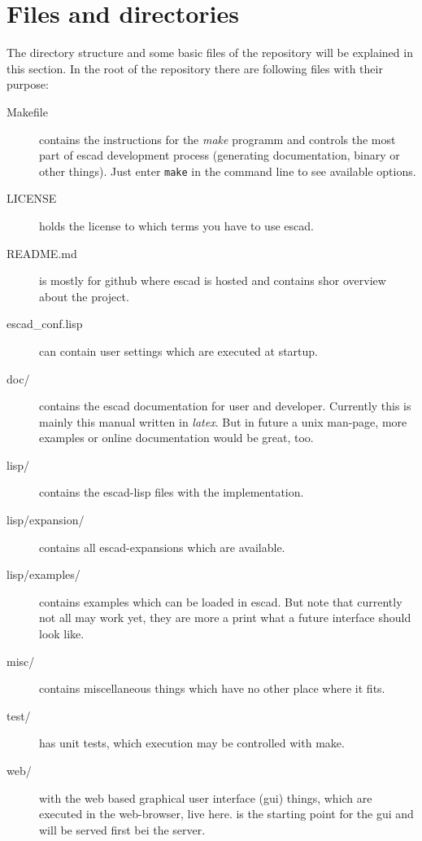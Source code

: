 \documentclass[a4paper, 12pt, openany]{scrbook}
\begin{document}
\section{Files and directories}
The directory structure and some basic files of the repository will be explained in this section. In the root of the repository there are following files with their purpose:
\begin{description}
\item[Makefile] contains the instructions for the \emph{make} programm and controls the most part of escad development process (generating documentation, binary or other things). Just enter \texttt{make} in the command line to see available options.
\item[LICENSE] holds the license to which terms you have to use escad.
\item[README.md] is mostly for github where escad is hosted and contains shor overview about the project.
\item[escad\_conf.lisp] can contain user settings which are executed at startup.
\item[doc/] contains the escad documentation for user and developer. Currently this is mainly this manual written in \emph{latex}. But in future a unix man-page, more examples or online documentation would be great, too.
\item[lisp/] contains the escad-lisp files with the implementation.
\item[lisp/expansion/] contains all escad-expansions which are available.
\item[lisp/examples/] contains examples which can be loaded in escad. But note that currently not all may work yet, they are more a print what a future interface should look like.
\item[misc/] contains miscellaneous things which have no other place where it fits.
\item[test/] has unit tests, which execution may be controlled with make.
\item[web/] with the web based graphical user interface (gui) things, which are executed in the web-browser, live here.  is the starting point for the gui and will be served first bei the server.
\end{description}
\end{document}
